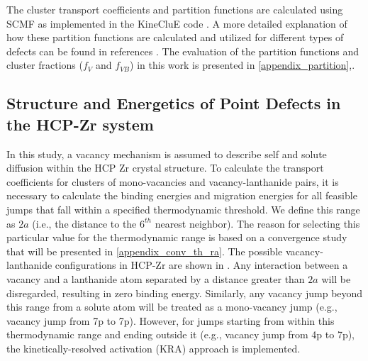 \documentclass[preprint,12pt]{elsarticle}
\begin{document}
The cluster transport coefficients and partition functions are calculated using SCMF as implemented in the KineCluE code \cite{schuler_kineclue_2020}. A more detailed explanation of how these partition functions are calculated and utilized for different types of defects can be found in references \cite{messina_solute_2020, schuler_kineclue_2020}. 
The evaluation of the partition functions and cluster fractions ($f_V$ and $f_{VB}$) in this work is presented in \ref{appendix_partition},. 

\subsection{Structure and Energetics of Point Defects in the HCP-Zr system}

\FloatBarrier

In this study, a vacancy mechanism is assumed to describe self and solute diffusion within the HCP Zr crystal structure. To calculate the transport coefficients for clusters of mono-vacancies and vacancy-lanthanide pairs, it is necessary to calculate the binding energies and migration energies for all feasible jumps that fall within a specified thermodynamic threshold. We define this range as $2a$ (i.e., the distance to the $6^{th}$ nearest neighbor). The reason for selecting this particular value for the thermodynamic range is based on a convergence study that will be presented in \ref{appendix_conv_th_ra}. The possible vacancy-lanthanide configurations in HCP-Zr are shown in . Any interaction between a vacancy and a lanthanide atom separated by a distance greater than $2a$  will be disregarded, resulting in zero binding energy. Similarly, any vacancy jump beyond this range from a solute atom will be treated as a mono-vacancy jump (e.g., vacancy jump from 7p to 7p). However, for jumps starting from within this thermodynamic range and ending outside it (e.g., vacancy jump from 4p to 7p), the kinetically-resolved activation (KRA) approach \cite{van_der_ven_first_2005} is implemented. 
\end{document}
